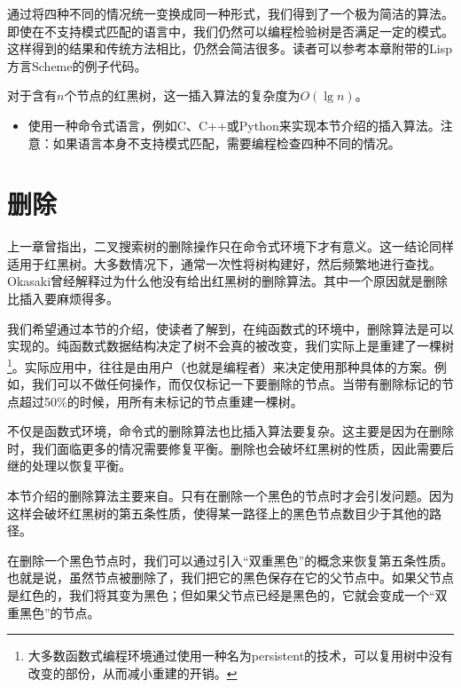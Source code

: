 \documentclass[UTF8]{article}
\begin{document}
通过将四种不同的情况统一变换成同一种形式，我们得到了一个极为简洁的算法。即使在不支持模式匹配的语言中，我们仍然可以编程检验树是否满足一定的模式。这样得到的结果和传统方法相比，仍然会简洁很多。读者可以参考本章附带的Lisp方言Scheme的例子代码。

对于含有$n$个节点的红黑树，这一插入算法的复杂度为$O(\lg n)$。

\begin{Exercise}

\begin{itemize}
\item 使用一种命令式语言，例如C、C++或Python来实现本节介绍的插入算法。注意：如果语言本身不支持模式匹配，需要编程检查四种不同的情况。
\end{itemize}

\end{Exercise}


\section{删除}

上一章曾指出，二叉搜索树的删除操作只在命令式环境下才有意义。这一结论同样适用于红黑树。大多数情况下，通常一次性将树构建好，然后频繁地进行查找。Okasaki曾经解释过为什么他没有给出红黑树的删除算法\cite{okasaki-blog}。其中一个原因就是删除比插入要麻烦得多。

我们希望通过本节的介绍，使读者了解到，在纯函数式的环境中，删除算法是可以实现的。纯函数式数据结构决定了树不会真的被改变，我们实际上是重建了一棵树\footnote{大多数函数式编程环境通过使用一种名为persistent的技术，可以复用树中没有改变的部份，从而减小重建的开销。}。实际应用中，往往是由用户（也就是编程者）来决定使用那种具体的方案。例如，我们可以不做任何操作，而仅仅标记一下要删除的节点。当带有删除标记的节点超过50\%的时候，用所有未标记的节点重建一棵树。

不仅是函数式环境，命令式的删除算法也比插入算法要复杂。这主要是因为在删除时，我们面临更多的情况需要修复平衡。删除也会破坏红黑树的性质，因此需要后继的处理以恢复平衡。

本节介绍的删除算法主要来自\cite{lyn}。只有在删除一个黑色的节点时才会引发问题。因为这样会破坏红黑树的第五条性质，使得某一路径上的黑色节点数目少于其他的路径。

在删除一个黑色节点时，我们可以通过引入“双重黑色”\cite{CLRS}的概念来恢复第五条性质。也就是说，虽然节点被删除了，我们把它的黑色保存在它的父节点中。如果父节点是红色的，我们将其变为黑色；但如果父节点已经是黑色的，它就会变成一个“双重黑色”的节点。
\end{document}
